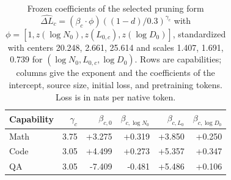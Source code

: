 \begin{table}[!htbp]\normalfont\centering\footnotesize
\begin{tabular*}{\textwidth}{@{\extracolsep{\fill}}lrrrrr@{}}
\toprule
Capability & $\gamma_c$ & $\beta_{c,0}$ & $\beta_{c,\log N_0}$ & $\beta_{c,L_0}$ & $\beta_{c,\log D_0}$ \\
\midrule
Math & 3.75 & +3.275 & +0.319 & +3.850 & +0.250 \\
Code & 3.05 & +4.499 & +0.273 & +5.357 & +0.347 \\
QA & 3.05 & -7.409 & -0.481 & +5.486 & +0.106 \\
\bottomrule\end{tabular*}
\caption{Frozen coefficients of the selected pruning form $\widehat{\Delta L}_c=(\beta_c\cdot\phi)((1-d)/0.3)^{\gamma_c}$ with $\phi=[1,z(\log N_0),z(L_{0,c}),z(\log D_0)]$, standardized with centers 20.248, 2.661, 25.614 and scales 1.407, 1.691, 0.739 for $(\log N_0, L_{0,c}, \log D_0)$. Rows are capabilities; columns give the exponent and the coefficients of the intercept, source size, initial loss, and pretraining tokens. Loss is in nats per native token.}
\label{tab:round3_coef}\end{table}
